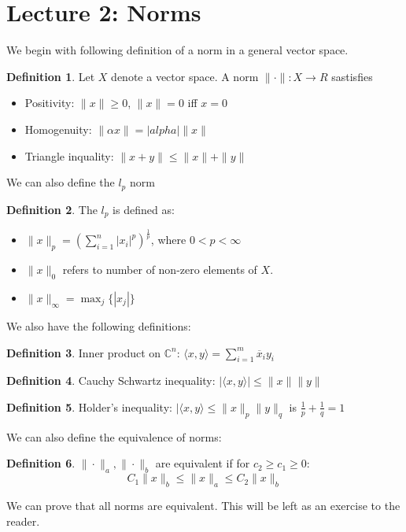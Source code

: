 \documentclass[11pt]{article}
\theoremstyle{definition}
\newtheorem{definition}{Definition}[section]
\newcommand{\C}{\mathbb{C}}
\begin{document}
\section{Lecture 2: Norms}
We begin with following definition of a norm in a general vector space. 
\begin{definition}
  Let $X$ denote a vector space. A norm $\| \cdot \| : X \to R$ sastisfies
  \begin{itemize}
    \item Positivity: $\| x\| \geq 0$, $\| x \| = 0$ iff $x = 0$
    \item Homogenuity: $\| \alpha x \| = |alpha| \| x \|$ 
    \item Triangle inquality: $\| x + y \| \leq \| x \| + \| y \|$
  \end{itemize}
\end{definition}
We can also define the $l_p$ norm
\begin{definition}
  The $l_p$ is defined as:
  \begin{itemize}
    \item $\| x\|_p = \left( \sum_{i = 1}^{n} |x_i|^p \right)^\frac{1}{p}$, where $0 < p < \infty$
    \item $\|x \|_0$ refers to number of non-zero elements of $X$. 
    \item $\| x \|_\infty = \max_j \{ |x_j| \}$
  \end{itemize}
\end{definition}
We also have the following definitions: 
\begin{definition}
  Inner product on $\C^n$: $\langle x, y \rangle = \sum_{i = 1}^{m} \overline{x}_i y_i$
\end{definition}
\begin{definition}
  Cauchy Schwartz inequality: $| \langle x, y \rangle | \leq \|x \| \|y \|$
\end{definition}

\begin{definition}
  Holder's inequality: $| \langle x, y \rangle \leq \|x\|_p \|y\|_q$ is $\frac{1}{p} + \frac{1}{q} = 1$
\end{definition}
We can also define the equivalence of norms:
\begin{definition}
  $\| \cdot \|_a, \| \cdot \|_b$ are equivalent if for $c_2 \geq c_1 \geq 0$:
  \[
  C_1 \|x \|_b \leq \|x \|_a \leq C_2 \|x\|_b
  \]
\end{definition}
We can prove that all norms are equivalent. This will be left as an exercise to the reader. 
\end{document}

